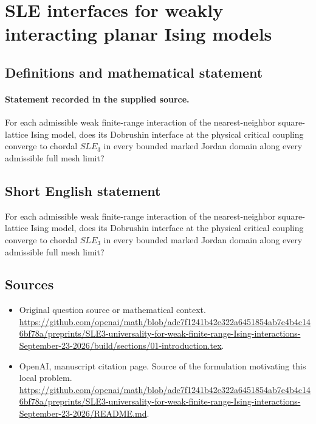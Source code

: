 \documentclass[11pt]{article}
\begin{document}
\section*{SLE interfaces for weakly interacting planar Ising models}\label{30007410}
\subsection{Definitions and mathematical statement}
\paragraph{Statement recorded in the supplied source.}
For each admissible weak finite-range interaction of the nearest-neighbor square-lattice Ising model, does its Dobrushin interface at the physical critical coupling converge to chordal $SLE_3$ in every bounded marked Jordan domain along every admissible full mesh limit?
\subsection{Short English statement}
For each admissible weak finite-range interaction of the nearest-neighbor square-lattice Ising model, does its Dobrushin interface at the physical critical coupling converge to chordal $SLE_3$ in every bounded marked Jordan domain along every admissible full mesh limit?
\subsection{Sources}
\begin{itemize}
\item[S1] Original question source or mathematical context.
\url{https://github.com/openai/math/blob/adc7f1241b42e322a6451854ab7e4b4c146bf78a/preprints/SLE3-universality-for-weak-finite-range-Ising-interactions-September-23-2026/build/sections/01-introduction.tex}.
\item[S2] OpenAI, manuscript citation page. Source of the formulation motivating this local problem.
\url{https://github.com/openai/math/blob/adc7f1241b42e322a6451854ab7e4b4c146bf78a/preprints/SLE3-universality-for-weak-finite-range-Ising-interactions-September-23-2026/README.md}.
\end{itemize}
\end{document}

